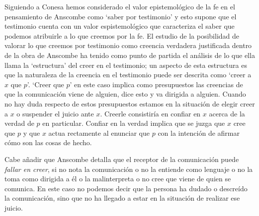 Siguiendo a Conesa hemos considerado el valor epistemológico de la fe en el pensamiento de Anscombe como `saber por testimonio' y esto supone que el testimonio cuenta con un valor espistemológico que caracteriza el saber que podemos atribuirle a lo que creemos por la fe. El estudio de la posibilidad de valorar lo que creemos por testimonio como creencia verdadera justificada dentro de la obra de Anscombe ha tenido como punto de partida el análisis de lo que ella llama la `estructura' del creer en el testimonio; un aspecto de esta estructura es que la naturaleza de la creencia en el testimonio puede ser descrita como `creer a $x$ que $p$'. `Creer que $p$' en este caso implica como presupuestos las creencias de que la comunicación viene de alguien, dice esto y va dirigida a alguien. Cuando no hay duda respecto de estos presupuestos estamos en la situación de elegir creer a $x$ o suspender el juicio ante $x$. Creerle consistiría en confiar en $x$ acerca de la verdad de $p$ en particular. Confiar en la verdad implica que se juzga que $x$ cree que $p$ y que $x$ actua rectamente al enunciar que $p$ con la intención de afirmar cómo son las cosas de hecho.

Cabe añadir que Anscombe detalla que el receptor de la comunicación puede \emph{fallar en creer}, si no nota la comunicación o no la entiende como lenguaje o no la toma como dirigida a él o la malinterpreta o no cree que viene de quien se comunica. En este caso no podemos decir que la persona ha dudado o descreído la comunicación, sino que no ha llegado a estar en la situación de realizar ese juicio.

